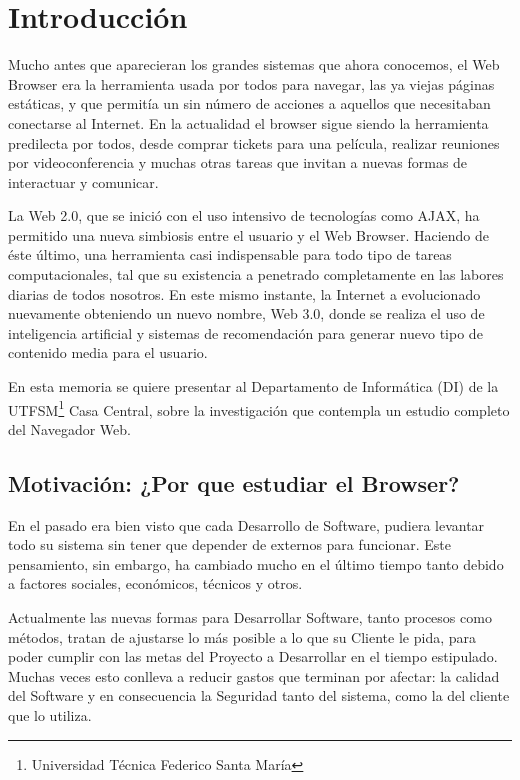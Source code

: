 \chapter{Introducción}
\label{chap:intro}

Mucho antes que aparecieran los grandes sistemas que ahora conocemos, el Web Browser era la herramienta usada por todos para navegar, las ya viejas páginas estáticas, y que permitía un sin número de acciones a aquellos que necesitaban conectarse al Internet. En la actualidad el browser sigue siendo la herramienta predilecta por todos, desde comprar tickets para una película, realizar reuniones por videoconferencia y muchas otras tareas que invitan a nuevas formas de interactuar y comunicar.


La Web 2.0, que se inició con el uso intensivo de tecnologías como AJAX, ha permitido una nueva simbiosis entre el usuario y el Web Browser. Haciendo de éste último, una herramienta casi indispensable para todo tipo de tareas computacionales, tal que su existencia a penetrado completamente en las labores diarias de todos nosotros. En este mismo instante, la Internet a evolucionado nuevamente obteniendo un nuevo nombre, Web 3.0, donde se realiza el uso de inteligencia artificial y sistemas de recomendación para generar nuevo tipo de contenido media para el usuario.


En esta memoria se quiere presentar al Departamento de Informática (DI) de la UTFSM\footnote{Universidad Técnica Federico Santa María} Casa Central, sobre la investigación que contempla un estudio completo del Navegador Web.



\section{Motivación: ¿Por que estudiar el Browser?}
\label{chap:motiv}
En el pasado era bien visto que cada Desarrollo de Software, pudiera levantar todo su sistema sin tener que depender de externos para funcionar. Este pensamiento, sin embargo, ha cambiado mucho en el último tiempo tanto debido a factores sociales, económicos, técnicos y otros. 

Actualmente las nuevas formas para Desarrollar Software, tanto procesos como métodos, tratan de ajustarse lo más posible a lo que su Cliente le pida, para poder cumplir con las metas del Proyecto a Desarrollar en el tiempo estipulado. Muchas veces esto conlleva a reducir gastos que terminan por afectar: la calidad del Software y en consecuencia la Seguridad tanto del sistema, como la del cliente que lo utiliza.

